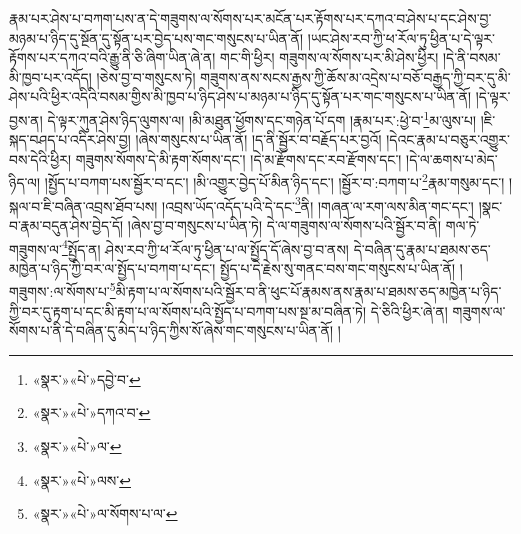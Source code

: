 རྣམ་པར་ཤེས་པ་བཀག་པས་ན་དེ་གཟུགས་ལ་སོགས་པར་མངོན་པར་རྟོགས་པར་དཀའ་བ་ཤེས་པ་དང་ཤེས་བྱ་མཉམ་པ་ཉིད་དུ་སྔོན་དུ་སྟོན་པར་བྱེད་པས་གང་གསུངས་པ་ཡིན་ནོ། །ཡང་ཤེས་རབ་ཀྱི་ཕ་རོལ་ཏུ་ཕྱིན་པ་དེ་ལྟར་རྟོགས་པར་དཀའ་བའི་རྒྱུ་ནི་ཅི་ཞིག་ཡིན་ཞེ་ན། གང་གི་ཕྱིར། གཟུགས་ལ་སོགས་པར་མི་ཤེས་ཕྱིར། །དེ་ནི་བསམ་མི་ཁྱབ་པར་འདོད། །ཅེས་བྱ་བ་གསུངས་ཏེ། གཟུགས་ནས་སངས་རྒྱས་ཀྱི་ཆོས་མ་འདྲེས་པ་བཅོ་བརྒྱད་ཀྱི་བར་དུ་མི་ཤེས་པའི་ཕྱིར་འདིའི་བསམ་གྱིས་མི་ཁྱབ་པ་ཉིད་ཤེས་པ་མཉམ་པ་ཉིད་དུ་སྟོན་པར་གང་གསུངས་པ་ཡིན་ནོ། །དེ་ལྟར་བྱས་ན། དེ་ལྟར་ཀུན་ཤེས་ཉིད་ལུགས་ལ། །མི་མཐུན་ཕྱོགས་དང་གཉེན་པོ་དག །རྣམ་པར་:ཕྱེ་བ་\footnote{«སྣར་»«པེ་»དབྱེ་བ་}མ་ལུས་པ། །ཇི་སྐད་བཤད་པ་འདིར་ཤེས་བྱ། །ཞེས་གསུངས་པ་ཡིན་ནོ། །ད་ནི་སྦྱོར་བ་བརྗོད་པར་བྱའོ། །དེའང་རྣམ་པ་བཅུར་འགྱུར་བས་དེའི་ཕྱིར། གཟུགས་སོགས་དེ་མི་རྟག་སོགས་དང་། །དེ་མ་རྫོགས་དང་རབ་རྫོགས་དང་། །དེ་ལ་ཆགས་པ་མེད་ཉིད་ལ། །སྤྱོད་པ་བཀག་པས་སྦྱོར་བ་དང་། །མི་འགྱུར་བྱེད་པོ་མིན་ཉིད་དང་། །སྦྱོར་བ་:བཀག་པ་\footnote{«སྣར་»«པེ་»དཀའ་བ་}རྣམ་གསུམ་དང་། །སྐལ་བ་ཇི་བཞིན་འབྲས་ཐོབ་པས། །འབྲས་ཡོད་འདོད་པའི་དེ་དང་\footnote{«སྣར་»«པེ་»ལ་}ནི། །གཞན་ལ་རག་ལས་མིན་གང་དང་། །སྣང་བ་རྣམ་བདུན་ཤེས་བྱེད་དོ། །ཞེས་བྱ་བ་གསུངས་པ་ཡིན་ཏེ། དེ་ལ་གཟུགས་ལ་སོགས་པའི་སྦྱོར་བ་ནི། གལ་ཏེ་གཟུགས་ལ་\footnote{«སྣར་»«པེ་»ལས་}སྤྱོད་ན། ཤེས་རབ་ཀྱི་ཕ་རོལ་ཏུ་ཕྱིན་པ་ལ་སྤྱོད་དོ་ཞེས་བྱ་བ་ནས། དེ་བཞིན་དུ་རྣམ་པ་ཐམས་ཅད་མཁྱེན་པ་ཉིད་ཀྱི་བར་ལ་སྤྱོད་པ་བཀག་པ་དང་། སྤྱོད་པ་དེ་རྗེས་སུ་གནང་བས་གང་གསུངས་པ་ཡིན་ནོ། །གཟུགས་:ལ་སོགས་པ་\footnote{«སྣར་»«པེ་»ལ་སོགས་པ་ལ་}མི་རྟག་པ་ལ་སོགས་པའི་སྦྱོར་བ་ནི་ཕུང་པོ་རྣམས་ནས་རྣམ་པ་ཐམས་ཅད་མཁྱེན་པ་ཉིད་ཀྱི་བར་དུ་རྟག་པ་དང་མི་རྟག་པ་ལ་སོགས་པའི་སྤྱོད་པ་བཀག་པས་སྔ་མ་བཞིན་ཏེ། དེ་ཅིའི་ཕྱིར་ཞེ་ན། གཟུགས་ལ་སོགས་པ་ནི་དེ་བཞིན་དུ་མེད་པ་ཉིད་ཀྱིས་སོ་ཞེས་གང་གསུངས་པ་ཡིན་ནོ། །
